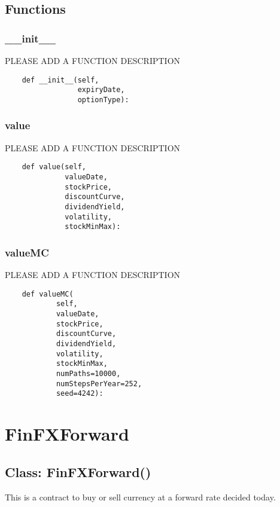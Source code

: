 \documentclass[twoside,11pt]{book}
\begin{document}
\subsection*{Functions}

\subsubsection*{{\bf \_\_init\_\_}}
PLEASE ADD A FUNCTION DESCRIPTION

\begin{lstlisting}
    def __init__(self,
                 expiryDate,
                 optionType):
\end{lstlisting}

\subsubsection*{{\bf value}}
PLEASE ADD A FUNCTION DESCRIPTION

\begin{lstlisting}
    def value(self,
              valueDate,
              stockPrice,
              discountCurve,
              dividendYield,
              volatility,
              stockMinMax):
\end{lstlisting}

\subsubsection*{{\bf valueMC}}
PLEASE ADD A FUNCTION DESCRIPTION

\begin{lstlisting}
    def valueMC(
            self,
            valueDate,
            stockPrice,
            discountCurve,
            dividendYield,
            volatility,
            stockMinMax,
            numPaths=10000,
            numStepsPerYear=252,
            seed=4242):
\end{lstlisting}

\newpage
\section{FinFXForward}

\subsection*{Class: FinFXForward()}
This is a contract to buy or sell currency at a forward rate decided today.  
\end{document}
